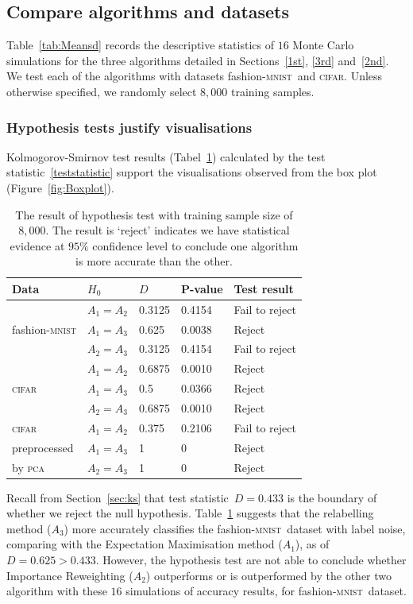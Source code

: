 \documentclass[12pt]{article} %
\newcommand{\mnist}{fashion-\textsc{mnist}}
\begin{document}
\subsection{Compare algorithms and datasets}

Table~\ref{tab:Meansd} records the descriptive statistics of $16$ Monte Carlo simulations for the three algorithms detailed in Sections~\ref{1st}, \ref{3rd} and~\ref{2nd}.  We test each of the algorithms with datasets \mnist\ and \textsc{cifar}. Unless otherwise specified, we randomly select $8,000$ training samples.
\subsubsection{Hypothesis tests justify visualisations}
Kolmogorov-Smirnov test results (Tabel~\ref{tab:HypothesisTest}) calculated by the test statistic~\eqref{teststatistic} support the visualisations observed from the box plot (Figure~\ref{fig:Boxplot}).
\begin{table}%
\centering
 	\caption{The result of hypothesis test with training sample size of $8,000$. The result is `reject' indicates we have  statistical evidence at $95\%$ confidence level to conclude one algorithm is more accurate than the other.}
	\begin{tabular}{lllll}
\toprule
Data & $H_0$ & $D$ & P-value & Test result\\
\midrule
 & $A_1= A_2$  &0.3125 & 0.4154 & Fail to reject\\

\mnist & $A_1= A_3$ & 0.625 & 0.0038 & Reject\\

  & $A_2= A_3$ & 0.3125 & 0.4154 & Fail to reject\\
\midrule
   & $A_1= A_2$ & 0.6875 & 0.0010 & Reject\\

 \textsc{cifar}  & $A_1= A_3$ & 0.5 & 0.0366 & Reject\\

  &  $A_2=A_3$  & 0.6875 & 0.0010 & Reject\\
 \midrule
  \textsc{cifar} & $A_1= A_2$ & 0.375 & 0.2106 & Fail to reject\\

  preprocessed & $A_1= A_3$ & 1 & 0 & Reject\\

  by \textsc{pca} &  $A_2=A_3$  & 1 & 0 & Reject\\
\bottomrule
\end{tabular}

	\label{tab:HypothesisTest}
\end{table}
Recall from Section~\ref{sec:ks} that test statistic~$D=0.433$ is the boundary of whether we reject the null hypothesis. Table~\ref{tab:HypothesisTest} suggests that the relabelling method ($A_3$) more accurately classifies the \mnist\ dataset with label noise, comparing with the Expectation Maximisation method ($A_1$), as of $D=0.625>0.433$.
However, the hypothesis test are not able to conclude whether Importance Reweighting ($A_2$) outperforms or is outperformed by the other two algorithm with these $16$ simulations of accuracy results, for \mnist\ dataset.
\end{document}
